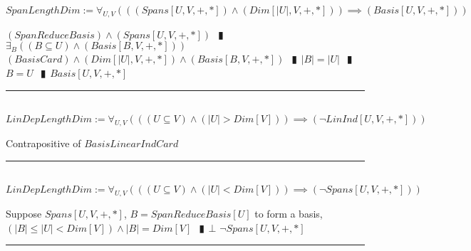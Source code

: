 \documentclass{book}
\newcommand{\abr}{:=}
\newcommand{\pipe}{$\phantom{(}\vrectangleblack\phantom{)}$}
\newcommand{\pr}[1]{\left(#1\right)}
\begin{document}
$SpanLengthDim \abr \forall_{U, V}\pr{\pr{(Spans[U, V, +, *]) \land (Dim[|U|, V, +, *])} \implies (Basis[U, V, +, *])}$
\begin{enumerate}
  \lit $(SpanReduceBasis) \land (Spans[U, V, +, *])$ \pipe $\exists_{B}\pr{(B \subseteq U) \land (Basis[B, V, +, *])}$
  \lit $(BasisCard) \land (Dim[|U|, V, +, *]) \land (Basis[B, V, +, *])$ \pipe $|B| = |U|$ \pipe $B = U$ \pipe $Basis[U, V, +, *]$
\end{enumerate} \vspace{.75mm} \hrule \vspace{.75mm} \ \\ 

$LinDepLengthDim \abr \forall_{U, V}\pr{\pr{(U \subseteq V) \land (|U| > Dim[V])} \implies (\lnot LinInd[U, V, +, *])}$
\begin{enumerate}
  \lit Contrapositive of $BasisLinearIndCard$
\end{enumerate} \vspace{.75mm} \hrule \vspace{.75mm} \ \\ 

$LinDepLengthDim \abr \forall_{U, V}\pr{\pr{(U \subseteq V) \land (|U| < Dim[V])} \implies (\lnot Spans[U, V, +, *])}$
\begin{enumerate}
  \lit Suppose $Spans[U, V, +, *]$, $B = SpanReduceBasis[U]$ to form a basis, $(|B| \leq |U| < Dim[V]) \land |B| = Dim[V]$ \pipe $\bot$
  \lit $\lnot Spans[U, V, +, *]$
\end{enumerate} \vspace{.75mm} \hrule \vspace{.75mm} \ \\ 
\end{document}
